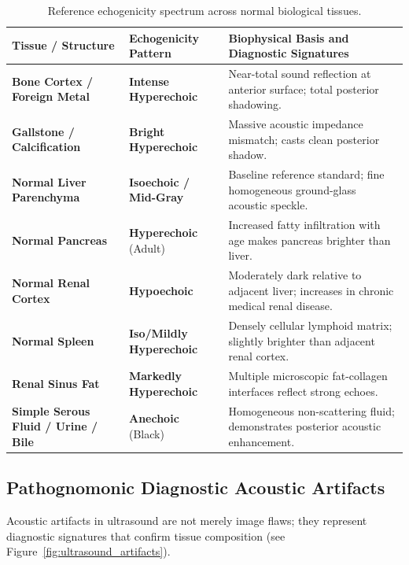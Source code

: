 \documentclass[11pt,a4paper]{article}
\begin{document}
\begin{table}[htbp]
\centering
\small
\renewcommand{\arraystretch}{1.2}
\begin{tabular}{p{4.5cm}p{3cm}p{7.5cm}}
\toprule
\textbf{Tissue / Structure} & \textbf{Echogenicity Pattern} & \textbf{Biophysical Basis and Diagnostic Signatures} \\
\midrule
\textbf{Bone Cortex / Foreign Metal} & \textbf{Intense Hyperechoic} & Near-total sound reflection at anterior surface; total posterior shadowing. \\
\textbf{Gallstone / Calcification} & \textbf{Bright Hyperechoic} & Massive acoustic impedance mismatch; casts clean posterior shadow. \\
\textbf{Normal Liver Parenchyma} & \textbf{Isoechoic / Mid-Gray} & Baseline reference standard; fine homogeneous ground-glass acoustic speckle. \\
\textbf{Normal Pancreas} & \textbf{Hyperechoic} (Adult) & Increased fatty infiltration with age makes pancreas brighter than liver. \\
\textbf{Normal Renal Cortex} & \textbf{Hypoechoic} & Moderately dark relative to adjacent liver; increases in chronic medical renal disease. \\
\textbf{Normal Spleen} & \textbf{Iso/Mildly Hyperechoic} & Densely cellular lymphoid matrix; slightly brighter than adjacent renal cortex. \\
\textbf{Renal Sinus Fat} & \textbf{Markedly Hyperechoic} & Multiple microscopic fat-collagen interfaces reflect strong echoes. \\
\textbf{Simple Serous Fluid / Urine / Bile} & \textbf{Anechoic} (Black) & Homogeneous non-scattering fluid; demonstrates posterior acoustic enhancement. \\
\bottomrule
\end{tabular}
\caption{Reference echogenicity spectrum across normal biological tissues.}
\label{tab:echogenicity_spectrum}
\end{table}

\subsection{Pathognomonic Diagnostic Acoustic Artifacts}
Acoustic artifacts in ultrasound are not merely image flaws; they represent diagnostic signatures that confirm tissue composition (see Figure~\ref{fig:ultrasound_artifacts}).
\end{document}
